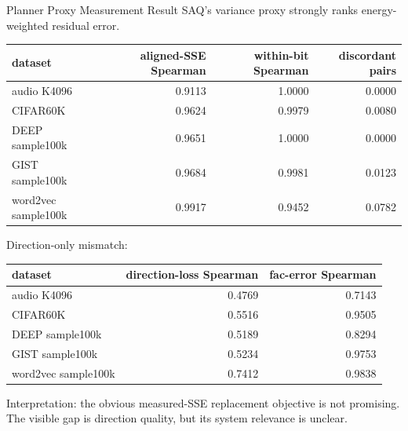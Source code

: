 \documentclass[aspectratio=169,10pt]{beamer}
\begin{document}
\begin{frame}[fragile]{Planner Proxy Measurement Result}
\scriptsize
SAQ's variance proxy strongly ranks energy-weighted residual error.

\vspace{0.4em}
\begin{tabular}{lrrr}
\toprule
dataset & aligned-SSE Spearman & within-bit Spearman & discordant pairs \\
\midrule
audio K4096 & 0.9113 & 1.0000 & 0.0000 \\
CIFAR60K & 0.9624 & 0.9979 & 0.0080 \\
DEEP sample100k & 0.9651 & 1.0000 & 0.0000 \\
GIST sample100k & 0.9684 & 0.9981 & 0.0123 \\
word2vec sample100k & 0.9917 & 0.9452 & 0.0782 \\
\bottomrule
\end{tabular}

\vspace{1em}
Direction-only mismatch:

\begin{tabular}{lrr}
\toprule
dataset & direction-loss Spearman & fac-error Spearman \\
\midrule
audio K4096 & 0.4769 & 0.7143 \\
CIFAR60K & 0.5516 & 0.9505 \\
DEEP sample100k & 0.5189 & 0.8294 \\
GIST sample100k & 0.5234 & 0.9753 \\
word2vec sample100k & 0.7412 & 0.9838 \\
\bottomrule
\end{tabular}

\vspace{0.8em}
\small
Interpretation: the obvious measured-SSE replacement objective is not promising.
The visible gap is direction quality, but its system relevance is unclear.
\end{frame}
\end{document}
